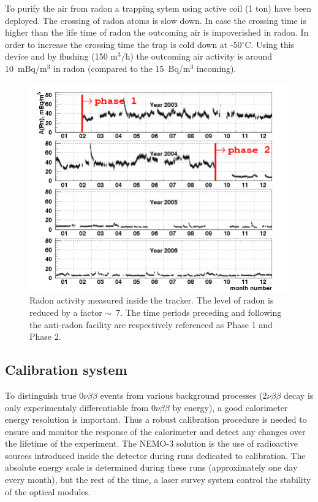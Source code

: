 \documentclass[main.tex]{subfiles}
\begin{document}
\bigskip


\NI To purify the air from radon a trapping sytem using active coil (1 ton) have been deployed. The crossing of radon atoms is slow down. In case the crossing time is higher than the life time of radon the outcoming air is impoverished in radon. In order to increase the crossing time the trap is cold down at -50$^\circ$C. Using this device and by flushing (150 m$^\text{3}$/h) the outcoming air activity is around 10~mBq/m$^\text{3}$ in radon (compared to the 15~Bq/m$^\text{3}$ incoming).

 
\begin{figure}[h!]
\begin{center}
\includegraphics[scale=0.7]{pictures/Chap3/rn_bytime.png}
\caption{Radon activity measured inside the tracker. The level of radon is reduced by a factor $\sim$~7. The time periods preceding and following the anti-radon facility are respectively referenced as Phase 1 and Phase 2.}
\label{RadonByTime}
\end{center}
\end{figure}


\FloatBarrier


\subsection{Calibration system}

\NI To distinguish true 0$\nu\beta\beta$ events from various background processes (2$\nu\beta\beta$ decay is only experimentaly differentiable from 0$\nu\beta\beta$ by energy), a good calorimeter energy resolution is important. Thus a robust calibration procedure is needed to ensure and monitor the response of the calorimeter and detect any changes over the lifetime of the experiment. The NEMO-3 solution is the use of radioactive sources introduced inside the detector during runs dedicated to calibration. The absolute energy scale is determined during these runs (approximately one day every month), but the rest of the time, a laser survey system control the stability of the optical modules. 
\end{document}
